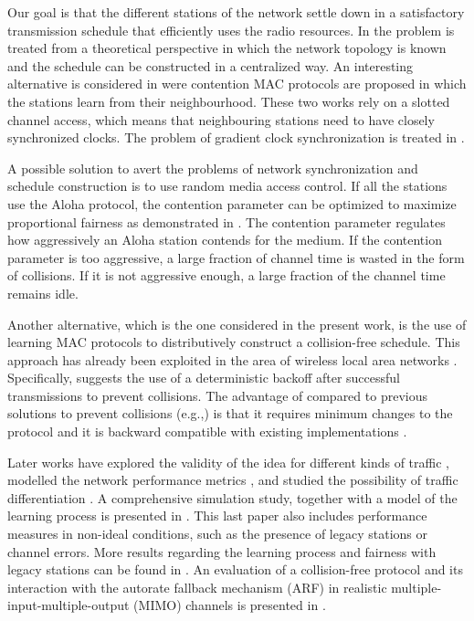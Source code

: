 \documentclass[twocolumn]{svjour3}          \smartqed  \usepackage{graphicx}
\begin{document}
Our goal is that the different stations of the network settle down in a satisfactory transmission schedule that efficiently uses the radio resources.
In \cite{ramanathan1993sam} the problem is treated from a theoretical perspective in which the network topology is known and the schedule can be constructed in a centralized way.
An interesting alternative is considered in \cite{yi2010msl} were contention MAC protocols are proposed in which the stations learn from their neighbourhood.
These two works rely on a slotted channel access, which means that neighbouring stations need to have closely synchronized clocks.
The problem of gradient clock synchronization is treated in \cite{sommer2009gcs}.

A possible solution to avert the problems of network synchronization and schedule construction is to use random media access control.
If all the stations use the Aloha protocol, the contention parameter can be optimized to maximize proportional fairness as demonstrated in \cite{kar2004apf}.
The contention parameter regulates how aggressively an Aloha station contends for the medium.
If the contention parameter is too aggressive, a large fraction of channel time is wasted in the form of collisions.
If it is not aggressive enough, a large fraction of the channel time remains idle.

Another alternative, which is the one considered in the present work, is the use of learning MAC protocols to distributively construct a collision-free schedule.
This approach has already been exploited in the area of wireless local area networks \cite{barcelo2008lba}.
Specifically, \cite{barcelo2008lba} suggests the use of a deterministic backoff after successful transmissions to prevent collisions.
The advantage of \cite{barcelo2008lba} compared to previous solutions to prevent collisions (e.g.,\cite{choi2005eei,tian2008ipc}) is that it requires minimum changes to the protocol and it is backward compatible with existing implementations \cite{barcelo2010fcc}.

Later works have explored the validity of the idea for different kinds of traffic \cite{bellalta2009vtc}, modelled the network performance metrics \cite{barcelo2009cpa}, and studied the possibility of traffic differentiation \cite{barcelo2009tpc}.
A comprehensive simulation study, together with a model of the learning process is presented in \cite{he2009sbr}.
This last paper also includes performance measures in non-ideal conditions, such as the presence of legacy stations or channel errors.
More results regarding the learning process and fairness with legacy stations can be found in \cite{barcelo2010fcc}.
An evaluation of a collision-free protocol and its interaction with the autorate fallback mechanism (ARF) in realistic multiple-input-multiple-output (MIMO) channels is presented in \cite{martorell2012pec}.
\end{document}
